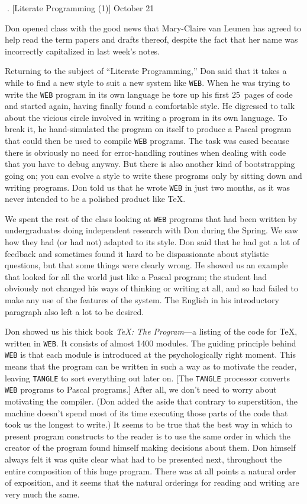 . [Literate Programming (1)] \pmr October 21

Don opened class with the good news that Mary-Claire van Leunen
has agreed to help read the term papers and drafts thereof, despite
the fact that her name was incorrectly capitalized in last week's
notes. 

Returning to the subject of ``Literate Programming,'' Don said that it
takes a while to find a new style to suit a new system like {\tt WEB}. When
he was trying to write the {\tt WEB} program in its own language he tore up
his first 25~pages of code and started again, having finally found a comfortable
style. He digressed to talk about the vicious circle involved in
writing a program in its own language. To break it, he hand-simulated the
program on itself to produce a Pascal program that could then be used
to compile {\tt WEB} programs. The task was eased because there is obviously
no need for error-handling routines when dealing with code that you have
to debug anyway. But
there is also another kind of bootstrapping going on; you can evolve a
style to write these programs only by sitting down and writing
programs.  Don told us that he wrote {\tt WEB} in just two months,
as it was never intended to be a polished product like \TeX.

We spent the rest of the class looking at {\tt WEB} programs that had been
written by undergraduates doing independent research with Don
during the Spring. We saw how
they had (or had not) adapted to its style. Don said that he had got a
lot of feedback and sometimes found it hard to be dispassionate about
stylistic questions, but that some things were clearly wrong.  He
showed us an example that looked for all the world just like a Pascal
program; the student had obviously not changed his ways of thinking or
writing at all, and so had failed to make any use of the features of
the system. The English in his introductory paragraph also left a lot
to be desired.

Don showed us his thick book {\sl \TeX: The Program\/}---a listing of the
code for \TeX, written in {\tt WEB}. It consists of almost 1400 modules.  The
guiding principle behind {\tt WEB} is that each module is introduced at the
psychologically right moment. This means that the program can be
written in such a way as to motivate the reader, leaving {\tt TANGLE} to
sort everything out later on. 
[The {\tt TANGLE} processor converts {\tt WEB} programs to Pascal
programs.]
After all, we don't need to worry about
motivating the compiler. (Don added the aside that contrary to
superstition, the machine doesn't spend most of its time executing
those parts of the code that took us the longest to write.) It seems to
be true that the best way in which to present program constructs to
the reader is to use the same order in which the creator of the program
found himself making decisions about them. Don himself always felt it
was quite clear what had to be presented next, throughout the entire
composition of this huge program. There was at all points a natural
order of exposition, and it seems that the natural orderings for
reading and writing are very much the same.

